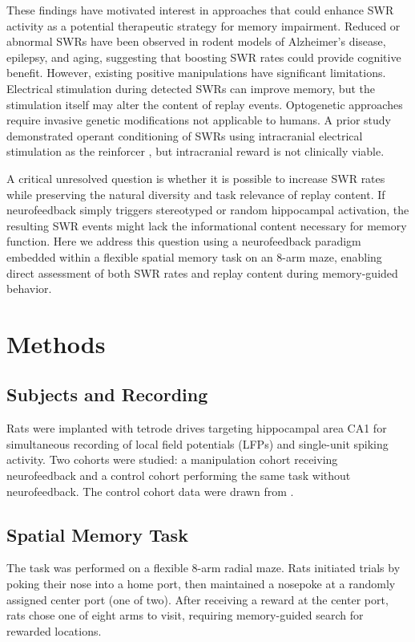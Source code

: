 \documentclass[11pt]{article}
\begin{document}
These findings have motivated interest in approaches that could enhance SWR activity as a potential therapeutic strategy for memory impairment. Reduced or abnormal SWRs have been observed in rodent models of Alzheimer's disease, epilepsy, and aging, suggesting that boosting SWR rates could provide cognitive benefit. However, existing positive manipulations have significant limitations. Electrical stimulation during detected SWRs can improve memory, but the stimulation itself may alter the content of replay events. Optogenetic approaches require invasive genetic modifications not applicable to humans. A prior study demonstrated operant conditioning of SWRs using intracranial electrical stimulation as the reinforcer \citep{ishikawa2014}, but intracranial reward is not clinically viable.

A critical unresolved question is whether it is possible to increase SWR rates while preserving the natural diversity and task relevance of replay content. If neurofeedback simply triggers stereotyped or random hippocampal activation, the resulting SWR events might lack the informational content necessary for memory function. Here we address this question using a neurofeedback paradigm embedded within a flexible spatial memory task on an 8-arm maze, enabling direct assessment of both SWR rates and replay content during memory-guided behavior.

\section{Methods}

\subsection{Subjects and Recording}

Rats were implanted with tetrode drives targeting hippocampal area CA1 for simultaneous recording of local field potentials (LFPs) and single-unit spiking activity. Two cohorts were studied: a manipulation cohort receiving neurofeedback and a control cohort performing the same task without neurofeedback. The control cohort data were drawn from \citet{gillespie2021}.

\subsection{Spatial Memory Task}

The task was performed on a flexible 8-arm radial maze. Rats initiated trials by poking their nose into a home port, then maintained a nosepoke at a randomly assigned center port (one of two). After receiving a reward at the center port, rats chose one of eight arms to visit, requiring memory-guided search for rewarded locations.
\end{document}

